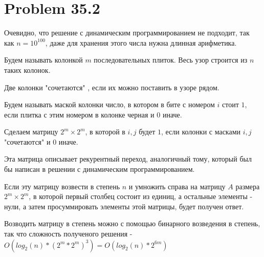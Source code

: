 \documentclass[a4paper,12pt]{article}
\begin{document}
\section{Problem 35.2}

Очевидно, что решение с динамическим программированием не подходит, так как $n = 10^{100}$, даже для хранения этого числа нужна длинная арифметика.

Будем называть колонкой $m$ последовательных плиток. Весь узор строится из $n$ таких колонок.

Две колонки "сочетаются" , если их можно поставить в узоре рядом.

Будем называть маской колонки число, в котором в бите с номером $i$ стоит $1$, если плитка с этим номером в колонке черная и $0$ иначе.

Сделаем матрицу $2^m \times 2^m$, в которой в $i, j$ будет $1$, если колонки с масками $i, j$ "сочетаются" и $0$ иначе.

Эта матрица описывает рекурентный переход, аналогичный тому, который был бы написан в решении с динамическим программированием. 

Если эту матрицу возвести в степень $n$ и умножить справа на матрицу $A$ размера $2^m \times 2^m$, в которой первый столбец состоит из единиц, а остальные элементы - нули, а затем просуммировать элементы этой матрицы, будет получен ответ.

Возводить матрицу в степень можно с помощью бинарного возведения в степень, так что сложность полученого решения - $O(log_2(n)*(2^m*2^m)^3)=O(log_2(n)*2^{6m})$
\end{document}
